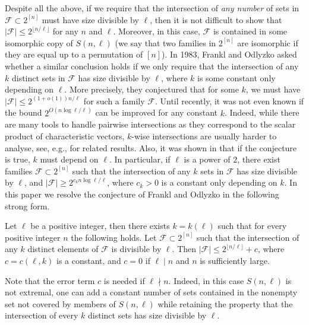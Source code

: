 	Despite all the above, if we require that the intersection of \emph{any number} of sets in $\mathcal{F}\subset 2^{[n]}$ must have size divisible by $\ell$, then it is not difficult to show that $|\mathcal{F}|\leq 2^{\lfloor n/\ell\rfloor}$ for any $n$ and $\ell$. Moreover, in this case, $\mathcal{F}$ is contained in some isomorphic copy of $S(n,\ell)$ (we say that two families in $2^{[n]}$ are isomorphic if they are equal up to a permutation of $[n]$). In 1983, Frankl and Odlyzko \cite{FO83} asked whether a similar conclusion holds if we only require that the intersection of any $k$ distinct sets in $\mathcal{F}$ has size divisible by $\ell$, where $k$ is some constant only depending on $\ell$. More precisely, they conjectured that for some $k$, we must have $|\mathcal{F}|\leq 2^{(1+o(1))n/\ell}$ for such a family $\mathcal{F}$. Until recently, it was not even known if the bound $2^{O(n\log \ell/\ell)}$ can be improved for any constant $k$. Indeed, while there are many tools to handle pairwise intersections as they correspond to the scalar product of characteristic vectors, $k$-wise intersections are usually harder to analyse, see, e.g.,  \cite{FS,GS02,MST,SV18,SV,V99} for related results. Also, it was shown in \cite{SV18} that if the conjecture is true, $k$ must depend on $\ell$. In particular, if $\ell$ is a power of $2$, there exist families $\mathcal{F}\subset 2^{[n]}$ such that the intersection of any $k$ sets in $\mathcal{F}$ has size divisible by $\ell$, and $|\mathcal{F}|\geq 2^{c_{k}n\log \ell/\ell}$, where $c_{k}>0$ is a constant only depending on $k$. In this paper we resolve the conjecture of Frankl and Odlyzko in the following strong form.
	
	\begin{theorem}\label{thm:main0}
		Let $\ell$ be a positive integer, then there exists $k=k(\ell)$ such that for every positive integer $n$ the following holds. Let $\mathcal{F}\subset 2^{[n]}$ such that the intersection of any $k$ distinct elements of $\mathcal{F}$ is divisible by $\ell$. Then $|\mathcal{F}|\leq 2^{\lfloor n/\ell\rfloor}+c$, where $c=c(\ell,k)$ is a constant, and $c=0$ if $\ell\mid n$ and $n$ is sufficiently large.
	\end{theorem}
	
	Note that the error term $c$ is needed if $\ell\nmid n$. Indeed, in this case $S(n,\ell)$ is not extremal, one can add a constant number of sets contained in the nonempty set not covered by members of $S(n,\ell)$ while retaining the property that the intersection of every $k$ distinct sets has size divisible by $\ell$.
